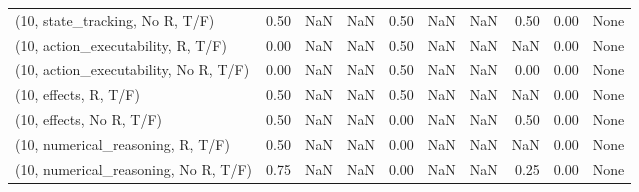 \begin{table*}[h!]
\begin{adjustbox}{width=2\columnwidth,center}
\begin{tabular}{lrrr|rrr|rrr}
(10, state\_tracking, No R, T/F)       &                      0.50 &                   NaN &                       NaN &                          0.50 &                       NaN &                           NaN &                                   0.50 &                               0.00 &                                  None \\
(10, action\_executability, R, T/F)    &                      0.00 &                   NaN &                       NaN &                          0.50 &                       NaN &                           NaN &                                    NaN &                               0.00 &                                  None \\
(10, action\_executability, No R, T/F) &                      0.00 &                   NaN &                       NaN &                          0.50 &                       NaN &                           NaN &                                   0.00 &                               0.00 &                                  None \\
(10, effects, R, T/F)                 &                      0.50 &                   NaN &                       NaN &                          0.50 &                       NaN &                           NaN &                                    NaN &                               0.00 &                                  None \\
(10, effects, No R, T/F)              &                      0.50 &                   NaN &                       NaN &                          0.00 &                       NaN &                           NaN &                                   0.50 &                               0.00 &                                  None \\
(10, numerical\_reasoning, R, T/F)     &                      0.50 &                   NaN &                       NaN &                          0.00 &                       NaN &                           NaN &                                    NaN &                               0.00 &                                  None \\
(10, numerical\_reasoning, No R, T/F)  &                      0.75 &                   NaN &                       NaN &                          0.00 &                       NaN &                           NaN &                                   0.25 &                               0.00 &                                  None \\

\end{tabular}
\end{adjustbox}
\end{table*}
